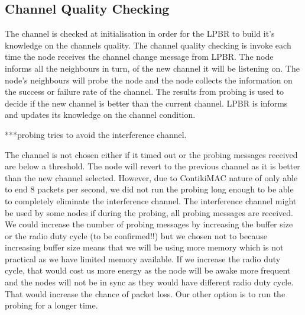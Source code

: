 


\subsection{Channel Quality Checking}

The channel is checked at initialisation in order for the LPBR to build it's knowledge on the channels quality. The channel quality checking is invoke each time the node receives the channel change message from LPBR. The node informs all the neighbours in turn, of the new channel it will be listening on. The node's neighbours will probe the node and the node collects the information on the success or failure rate of the channel. The results from probing is used to decide if the new channel is better than the current channel. LPBR is informs and updates its knowledge on the channel condition.

***probing tries to avoid the interference channel.

The channel is not chosen either if it timed out or the probing messages received are below a threshold. The node will revert to the previous channel as it is better than the new channel selected. However, due to ContikiMAC nature of only able to end 8 packets per second, we did not run the probing long enough to be able to completely eliminate the interference channel. The interference channel might be used by some nodes if during the probing, all probing messages are received. We could increase the number of probing messages by increasing the buffer size or the radio duty cycle (to be confirmed!!) but we chosen not to because increasing buffer size means that we will be using more memory which is not practical as we have limited memory available. If we increase the radio duty cycle, that would cost us more energy as the node will be awake more frequent and the nodes will not be in sync as they would have different radio duty cycle. That would increase the chance of packet loss. Our other option is to run the probing for a longer time.

